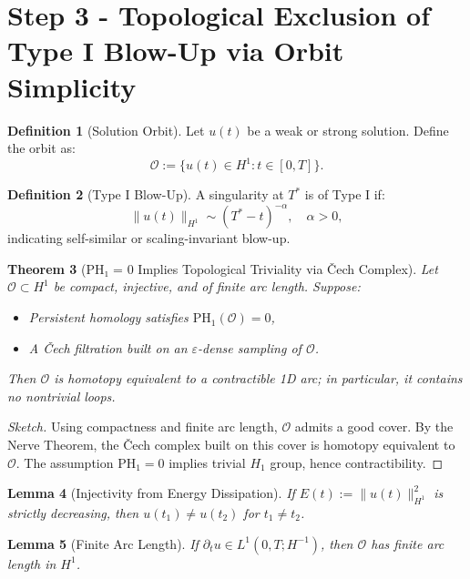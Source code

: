 \documentclass[11pt]{article}
\newtheorem{theorem}{Theorem}[section]
\newtheorem{lemma}[theorem]{Lemma}
\theoremstyle{definition}
\newtheorem{definition}[theorem]{Definition}
\begin{document}
\section{Step 3 - Topological Exclusion of Type I Blow-Up via Orbit Simplicity}

\begin{definition}[Solution Orbit]
Let $u(t)$ be a weak or strong solution. Define the orbit as:
\[
\mathcal{O} := \{u(t) \in H^1 : t \in [0,T]\}.
\]
\end{definition}

\begin{definition}[Type I Blow-Up]
A singularity at $T^*$ is of Type I if:
\[
\|u(t)\|_{H^1} \sim (T^* - t)^{-\alpha}, \quad \alpha > 0,
\]
indicating self-similar or scaling-invariant blow-up.
\end{definition}

\begin{theorem}[PH₁ = 0 Implies Topological Triviality via Čech Complex]\label{thm:cech-triviality}
Let $\mathcal{O} \subset H^1$ be compact, injective, and of finite arc length. Suppose:
\begin{itemize}
  \item Persistent homology satisfies $\mathrm{PH}_1(\mathcal{O}) = 0$,
  \item A Čech filtration built on an $\varepsilon$-dense sampling of $\mathcal{O}$.
\end{itemize}
Then $\mathcal{O}$ is homotopy equivalent to a contractible 1D arc; in particular, it contains no nontrivial loops.
\end{theorem}

\begin{proof}[Sketch]
Using compactness and finite arc length, $\mathcal{O}$ admits a good cover. By the Nerve Theorem, the Čech complex built on this cover is homotopy equivalent to $\mathcal{O}$. The assumption $\mathrm{PH}_1 = 0$ implies trivial $H_1$ group, hence contractibility.
\end{proof}

\begin{lemma}[Injectivity from Energy Dissipation]
If $E(t) := \|u(t)\|^2_{H^1}$ is strictly decreasing, then $u(t_1) \neq u(t_2)$ for $t_1 \neq t_2$.
\end{lemma}

\begin{lemma}[Finite Arc Length]
If $\partial_t u \in L^1(0,T; H^{-1})$, then $\mathcal{O}$ has finite arc length in $H^1$.
\end{lemma}
\end{document}
